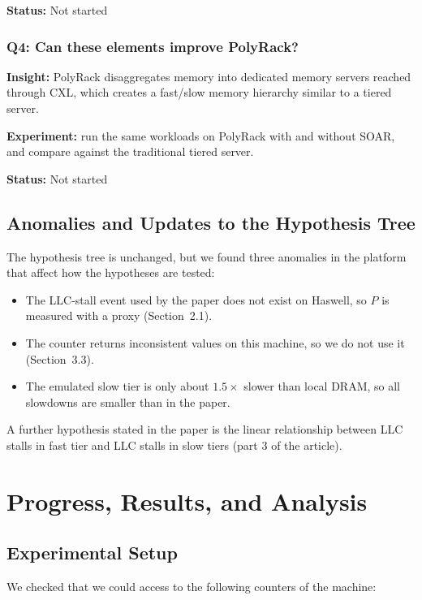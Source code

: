 \documentclass[10pt,a4paper]{article}
\begin{document}
\textbf{Status:} Not started

\subsubsection{Q4: Can these elements improve PolyRack?}
\textbf{Insight:} PolyRack disaggregates memory into dedicated
        memory servers reached through CXL, which creates a
        fast/slow memory hierarchy similar to a tiered server.

\textbf{Experiment:} run the same workloads on PolyRack with and
        without SOAR, and compare against the traditional tiered server.
        
\textbf{Status:} Not started

\subsection{Anomalies and Updates to the Hypothesis Tree}

The hypothesis tree is unchanged, but we found three anomalies in the platform that affect how the hypotheses are tested:

\begin{itemize}
    \item The LLC-stall event used by the paper does not exist on Haswell, so $P$ is measured with a proxy (Section~2.1).
    \item The counter  returns inconsistent values on this machine, so we do not use it (Section~3.3).
    \item The emulated slow tier is only about $1.5\times$ slower than local DRAM, so all slowdowns are smaller than in the paper.
\end{itemize}

A further hypothesis stated in the paper is the linear relationship between LLC stalls in fast tier and LLC stalls in slow tiers (part 3 of the article). 

\section{Progress, Results, and Analysis}

\subsection{Experimental Setup}
We checked that we could access to the following counters of the machine:
\end{document}
